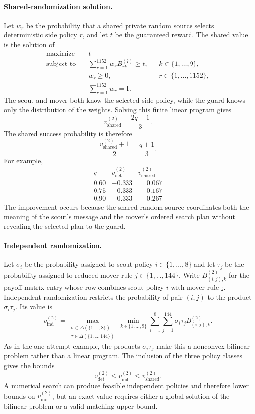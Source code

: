 \paragraph{Shared-randomization solution.}
Let $w_r$ be the probability that a shared private random source selects deterministic side policy $r$, and let $t$ be the guaranteed reward. The shared value is the solution of
\[
\begin{aligned}
    \text{maximize}\quad & t \\
    \text{subject to}\quad
    & \sum_{r=1}^{1152}w_r B^{(2)}_{rk}\geq t,
      && k\in\{1,\ldots,9\},\\
    & w_r\geq0,
      && r\in\{1,\ldots,1152\},\\
    & \sum_{r=1}^{1152}w_r=1.
\end{aligned}
\]
The scout and mover both know the selected side policy, while the guard knows only the distribution of the weights. Solving this finite linear program gives
\[
    v_{\mathrm{shared}}^{(2)}
    =
    \frac{2q-1}{3}.
\]
The shared success probability is therefore
\[
    \frac{v_{\mathrm{shared}}^{(2)}+1}{2}
    =
    \frac{q+1}{3}.
\]
For example,
\[
\begin{array}{c|cc}
q & v_{\mathrm{det}}^{(2)} & v_{\mathrm{shared}}^{(2)}\\ \hline
0.60 & -0.333 & \phantom{-}0.067\\
0.75 & -0.333 & \phantom{-}0.167\\
0.90 & -0.333 & \phantom{-}0.267
\end{array}
\]
The improvement occurs because the shared random source coordinates both the meaning of the scout's message and the mover's ordered search plan without revealing the selected plan to the guard.

\paragraph{Independent randomization.}
Let $\sigma_i$ be the probability assigned to scout policy $i\in\{1,\ldots,8\}$ and let $\tau_j$ be the probability assigned to reduced mover rule $j\in\{1,\ldots,144\}$. Write $B^{(2)}_{(i,j),k}$ for the payoff-matrix entry whose row combines scout policy $i$ with mover rule $j$. Independent randomization restricts the probability of pair $(i,j)$ to the product $\sigma_i\tau_j$. Its value is
\[
    v_{\mathrm{ind}}^{(2)}
    =
    \max_{\substack{\sigma\in\Delta(\{1,\ldots,8\})\\
                    \tau\in\Delta(\{1,\ldots,144\})}}
    \min_{k\in\{1,\ldots,9\}}
    \sum_{i=1}^{8}\sum_{j=1}^{144}
    \sigma_i\tau_j B^{(2)}_{(i,j),k}.
\]
As in the one-attempt example, the products $\sigma_i\tau_j$ make this a nonconvex bilinear problem rather than a linear program. The inclusion of the three policy classes gives the bounds
\[
    v_{\mathrm{det}}^{(2)}
    \leq
    v_{\mathrm{ind}}^{(2)}
    \leq
    v_{\mathrm{shared}}^{(2)}.
\]
A numerical search can produce feasible independent policies and therefore lower bounds on $v_{\mathrm{ind}}^{(2)}$, but an exact value requires either a global solution of the bilinear problem or a valid matching upper bound.


